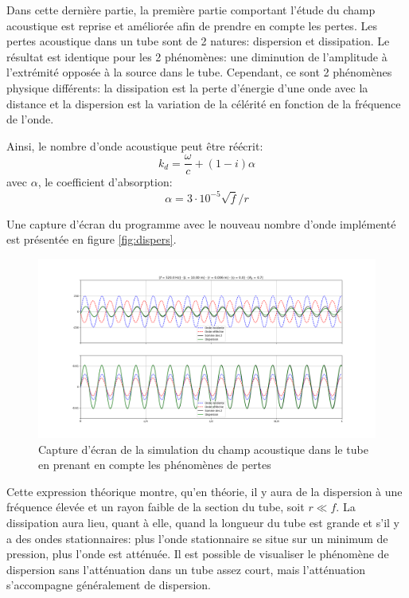 \documentclass[a4paper, 11pt]{article}
\begin{document}
Dans cette dernière partie, la première partie comportant l'étude du champ acoustique est reprise et améliorée afin de prendre en compte les pertes. Les pertes acoustique dans un tube sont de 2 natures: dispersion et dissipation. Le résultat est identique pour les 2 phénomènes: une diminution de l'amplitude à l'extrémité opposée à la source dans le tube. Cependant, ce sont 2 phénomènes physique différents: la dissipation est la perte d'énergie d'une onde avec la distance et la dispersion est la variation de la célérité en fonction de la fréquence de l'onde.

Ainsi, le nombre d'onde acoustique peut être réécrit:
\begin{equation}
	k_d = \frac{\omega}{c} + (1 - i) \alpha
\end{equation}
avec $\alpha$, le coefficient d'absorption:
\begin{equation}
	\alpha = 3 \cdot 10^{-5} \sqrt{f}/r
\end{equation}

Une capture d'écran du programme avec le nouveau nombre d'onde implémenté est présentée en figure \ref{fig:dispers}.

\begin{figure}[H]
	\centering 
	\includegraphics[width=\linewidth]{Figures/tubeKundt_dispers.png}
	\caption{Capture d'écran de la simulation du champ acoustique dans le tube en prenant en compte les phénomènes de pertes}
	\label{fig:simul_acpertes} 
\end{figure}


Cette expression théorique montre, qu'en théorie, il y aura de la dispersion à une fréquence élevée et un rayon faible de la section du tube, soit $r \ll f$. La dissipation aura lieu, quant à elle, quand la longueur du tube est grande et s'il y a des ondes stationnaires: plus l'onde stationnaire se situe sur un minimum de pression, plus l'onde est atténuée. Il est possible de visualiser le phénomène de dispersion sans l'atténuation dans un tube assez court, mais l'atténuation s'accompagne généralement de dispersion.
\end{document}
